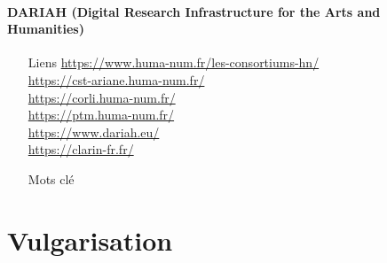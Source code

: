 \documentclass{book}
\newenvironment{titlemize}[1]{%
  \paragraph{#1}
  \begin{itemize}}
  {\end{itemize}}
\begin{document}
\begin{enumerate}
\begin{titlemize}{DARIAH (Digital Research Infrastructure for the Arts and Humanities)}
        \end{titlemize}
\end{enumerate}

\begin{itemize}
    \item [Liens]
        \url{https://www.huma-num.fr/les-consortiums-hn/}\label{liste_ariane_consortium}\\
        \url{https://cst-ariane.huma-num.fr/}\\
        \url{https://corli.huma-num.fr/}\\
        \url{https://ptm.huma-num.fr/}\\
        \url{ https://www.dariah.eu/}\\
        \url{https://clarin-fr.fr/}\\
       
    \item [Mots clé]
\end{itemize}


\section{Vulgarisation}
\end{document}
